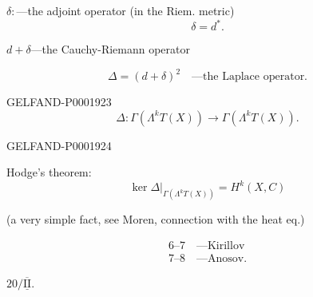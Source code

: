$\delta\colon$\quad —the adjoint operator (in the Riem. metric)
\begin{equation*}\delta=d^*.\end{equation*}



$d+\delta$—the Cauchy-Riemann operator



\begin{equation*}
\Delta=(d+\delta)^2\quad\text{—the Laplace operator.}
\end{equation*}



\begin{GelfandAdjacentEvidence}{GELFAND-P000192}{3}
\begin{equation*}
\Delta\colon\Gamma (\Lambda^kT (X))\longrightarrow\Gamma (\Lambda^kT (X)).
\end{equation*}
\end{GelfandAdjacentEvidence}
\begin{GelfandAdjacentEvidence}{GELFAND-P000192}{4}

Hodge's theorem:
\begin{equation*}
\ker\Delta\big|_{\Gamma (\Lambda^kT (X))}=H^k (X, C)
\end{equation*}
\end{GelfandAdjacentEvidence}

(a very simple fact, see Moren, connection with the heat eq.)



\begin{gather*}
6\text{--}7\quad\text{—Kirillov}\\
7\text{--}8\quad\text{—Anosov.}
\end{gather*}





\begin{center}
 $20/\overline{\underline{\mathrm{II}}}$.\\
\qquad {}
\end{center}



